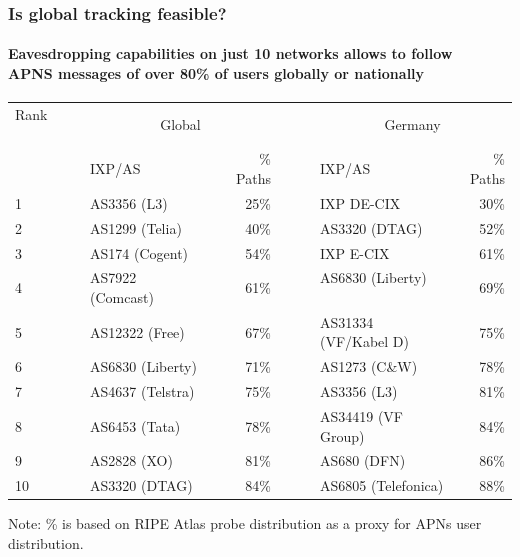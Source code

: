 \begin{frame}
\frametitle{Is global tracking feasible?}
\framesubtitle{Eavesdropping capabilities on just 10 networks allows to follow \\APNS messages of over 80\% of users globally or nationally}
\vspace{-10mm}
\captionsetup{justification=centering}
\begin{table}[!h]%
	\centering		
	\resizebox{\textwidth}{!}
	{\begin{tabular}{llrclr}
			\toprule
			Rank ~~~~~& \multicolumn{2}{c}{Global} && \multicolumn{2}{c}{Germany}	\\
			\cmidrule{2-3} \cmidrule{5-6}
			& IXP/AS  & \textSigma\% Paths &~~~& IXP/AS & \textSigma\% Paths   \\
			\midrule
			1 & AS3356 (L3)  & 25\%  && IXP DE-CIX & 30\% \\
			2 & AS1299 (Telia) & 40\%  && AS3320 (DTAG) & 52\% \\
			3 & AS174 (Cogent)  & 54\%  && IXP E-CIX & 61\% \\
			4 & AS7922 (Comcast)~~~  & 61\%  && AS6830 (Liberty) ~~~& 69\% \\
			5 & AS12322 (Free)  & 67\%  && AS31334 (VF/Kabel D) & 75\%\\
			6 & AS6830 (Liberty)  & 71\%  && AS1273 (C\&W)& 78\%\\
			7 & AS4637 (Telstra) & 75\%  && AS3356 (L3)  & 81\% \\
			8 & AS6453 (Tata) & 78\%  && AS34419 (VF Group)& 84\% \\
			9 & AS2828 (XO)  & 81\%  && AS680 (DFN) & 86\% \\
			10 & AS3320 (DTAG) & 84\% && AS6805 (Telefonica) & 88\% \\
			\bottomrule
	\end{tabular}}
	\label{tab:topnetworks}
\end{table}
\vspace{-3mm}
\small{Note: \% is based on RIPE Atlas probe distribution as a proxy for APNs user distribution.}
\end{frame}
\clearpage

